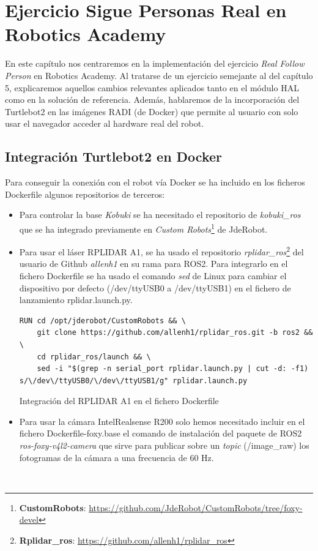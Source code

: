 \chapter{Ejercicio Sigue Personas Real en Robotics Academy}
\label{cap:capitulo6}

En este capítulo nos centraremos en la implementación del ejercicio \textit{Real Follow Person} en Robotics Academy. Al tratarse de un ejercicio semejante al del capítulo 5, explicaremos aquellos cambios relevantes aplicados tanto en el módulo HAL como en la solución de referencia. Además, hablaremos de la incorporación del Turtlebot2 en las imágenes RADI (de Docker) que permite al usuario con solo usar el navegador acceder al hardware real del robot.\\



\section{Integración Turtlebot2 en Docker}
\label{sec:integracion_turtlebot2_docker}

Para conseguir la conexión con el robot vía Docker se ha incluido en los ficheros Dockerfile algunos repositorios de terceros:

\begin{itemize}
	\item Para controlar la base \textit{Kobuki} se ha necesitado el repositorio de \textit{kobuki\_ros} que se ha integrado previamente en \textit{Custom Robots}\footnote{\textbf{CustomRobots}: \url{https://github.com/JdeRobot/CustomRobots/tree/foxy-devel}} de JdeRobot.
	
	\item Para usar el láser RPLIDAR A1, se ha usado el repositorio \textit{rplidar\_ros}\footnote{\textbf{Rplidar\_ros}: \url{https://github.com/allenh1/rplidar_ros}} del usuario de Github \textit{allenh1} en su rama para ROS2. Para integrarlo en el fichero Dockerfile se ha usado el comando \textit{sed} de Linux para cambiar el dispositivo por defecto (/dev/ttyUSB0 a /dev/ttyUSB1) en el fichero de lanzamiento rplidar.launch.py.
\begin{code}[H]
\begin{lstlisting}
RUN cd /opt/jderobot/CustomRobots && \
	git clone https://github.com/allenh1/rplidar_ros.git -b ros2 && \
	cd rplidar_ros/launch && \
	sed -i "$(grep -n serial_port rplidar.launch.py | cut -d: -f1) s/\/dev\/ttyUSB0/\/dev\/ttyUSB1/g" rplidar.launch.py
\end{lstlisting}
\caption{Integración del RPLIDAR A1 en el fichero Dockerfile}
\label{cod:rplidar_dockerfile}
\end{code}

	\item Para usar la cámara IntelRealsense R200 solo hemos necesitado incluir en el fichero Dockerfile-foxy.base el comando de instalación del paquete de ROS2 \textit{ros-foxy-v4l2-camera} que sirve para publicar sobre un \textit{topic} (/image\_raw) los fotogramas de la cámara a una frecuencia de 60 Hz.
\end{itemize}\


